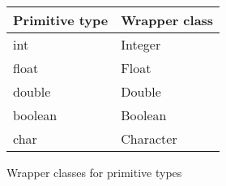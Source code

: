 




\begin {figure}

\begin {tabular} {l | l}
Primitive type &  Wrapper class		\\
\hline
int	&	Integer			\\
float	&	Float			\\
double	&	Double			\\
boolean	&	Boolean			\\
char	&	Character 
	
\end {tabular}


\caption {Wrapper classes for primitive types}
\label {fig:wrapper}

\end {figure}


